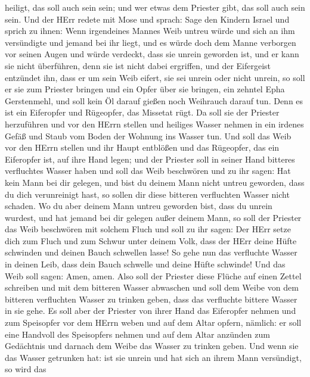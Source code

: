 heiligt, das soll auch sein sein; und wer etwas dem Priester gibt, das
soll auch sein sein.  Und der HErr redete mit Mose und
sprach:  Sage den Kindern Israel und sprich zu ihnen: Wenn
irgendeines Mannes Weib untreu würde und sich an ihm versündigte
 und jemand bei ihr liegt, und es würde doch dem Manne
verborgen vor seinen Augen und würde verdeckt, dass sie unrein geworden
ist, und er kann sie nicht überführen, denn sie ist nicht dabei
ergriffen,  und der Eifergeist entzündet ihn, dass er um
sein Weib eifert, sie sei unrein oder nicht unrein,  so
soll er sie zum Priester bringen und ein Opfer über sie bringen, ein
zehntel Epha Gerstenmehl, und soll kein Öl darauf gießen noch Weihrauch
darauf tun. Denn es ist ein Eiferopfer und Rügeopfer, das Missetat rügt.
 Da soll sie der Priester herzuführen und vor den HErrn
stellen  und heiliges Wasser nehmen in ein irdenes Gefäß
und Staub vom Boden der Wohnung ins Wasser tun.  Und soll
das Weib vor den HErrn stellen und ihr Haupt entblößen und das
Rügeopfer, das ein Eiferopfer ist, auf ihre Hand legen; und der Priester
soll in seiner Hand bitteres verfluchtes Wasser haben  und
soll das Weib beschwören und zu ihr sagen: Hat kein Mann bei dir
gelegen, und bist du deinem Mann nicht untreu geworden, dass du dich
verunreinigt hast, so sollen dir diese bitteren verfluchten Wasser nicht
schaden.  Wo du aber deinem Mann untreu geworden bist, dass
du unrein wurdest, und hat jemand bei dir gelegen außer deinem Mann,
 so soll der Priester das Weib beschwören mit solchem Fluch
und soll zu ihr sagen: Der HErr setze dich zum Fluch und zum Schwur
unter deinem Volk, dass der HErr deine Hüfte schwinden und deinen Bauch
schwellen lasse!  So gehe nun das verfluchte Wasser in
deinen Leib, dass dein Bauch schwelle und deine Hüfte schwinde! Und das
Weib soll sagen: Amen, amen.  Also soll der Priester diese
Flüche auf einen Zettel schreiben und mit dem bitteren Wasser abwaschen
 und soll dem Weibe von dem bitteren verfluchten Wasser zu
trinken geben, dass das verfluchte bittere Wasser in sie gehe.
 Es soll aber der Priester von ihrer Hand das Eiferopfer
nehmen und zum Speisopfer vor dem HErrn weben und auf dem Altar opfern,
nämlich:  er soll eine Handvoll des Speisopfers nehmen und
auf dem Altar anzünden zum Gedächtnis und darnach dem Weibe das Wasser
zu trinken geben.  Und wenn sie das Wasser getrunken hat:
ist sie unrein und hat sich an ihrem Mann versündigt, so wird das
